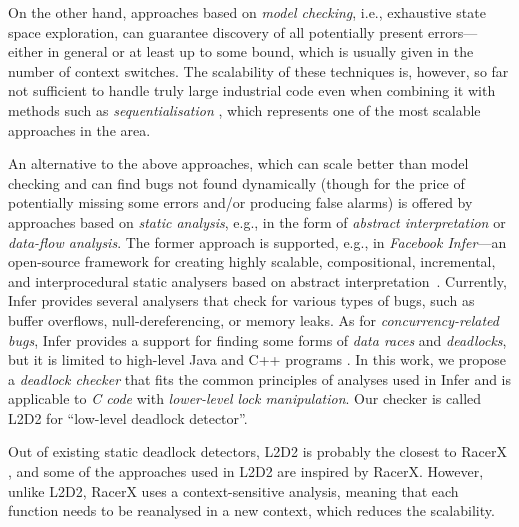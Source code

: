 \documentclass[runningheads]{llncs}
\begin{document}
On the other hand, approaches based on \emph{model checking}, i.e., exhaustive
state space exploration, can guarantee discovery of all potentially present
errors---either in general or at least up to some bound, which is usually given
in the number of context switches.
%
The scalability of these techniques is, however, so far not sufficient to handle
truly large industrial code even when combining it with methods such as
\emph{sequentialisation} \cite{lazy-seq-16}, 
%
%
which represents one of the most scalable approaches in the area.

An alternative to the above approaches, which can scale better than model
checking and can find bugs not found dynamically (though for the price of
potentially missing some errors and/or producing false alarms) is offered by
approaches based on \emph{static analysis}, e.g., in the form of \emph{abstract
interpretation} or \emph{data-flow analysis}.
%
The former approach is supported, e.g., in \emph{Facebook Infer}---an
open-source framework for creating highly scalable, compositional, incremental,
and interprocedural static analysers based on abstract
interpretation~\cite{inferNFM15}.
%
%
%
Currently, Infer provides several analysers that check for various types of
bugs, such as buffer overflows, null-dereferencing, or memory leaks.
%
%
As for \emph{concurrency-related bugs}, Infer provides a support for finding
some forms of \emph{data races} and \emph{deadlocks}, but it is limited to
high-level Java and C++ programs \cite{racerD18,inferCACM19}.
%
In this work, we propose a \emph{deadlock checker} that fits the common
principles of analyses used in Infer and is applicable to \emph{C code} with
\emph{lower-level lock manipulation}.
%
Our checker is called L2D2 for ``low-level deadlock detector''.

\enlargethispage{6mm}

Out of existing static deadlock detectors, L2D2 is probably the closest to
RacerX \cite{racerX03}, and some of the approaches used in L2D2 are inspired by
RacerX.
%
However, unlike L2D2, RacerX uses a context-sensitive analysis, meaning that
each function needs to be reanalysed in a new context, which reduces the
scalability.
\end{document}
